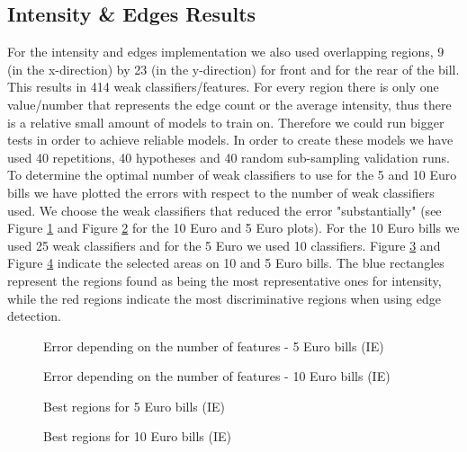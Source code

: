 \documentclass[11pt,twocolumn]{article}
\begin{document}
		
		\subsection{Intensity \& Edges Results}\label{sec:ie_results}
			For the intensity and edges implementation we also used overlapping regions, 9 (in the x-direction) by 23 (in the y-direction) for front and for the rear of the bill. This results in 414 weak classifiers/features. For every region there is only one value/number that represents the edge count or the average intensity, thus there is a relative small amount of models to train on. Therefore we could run bigger tests in order to achieve reliable models. In order to create these models we have used 40 repetitions, 40 hypotheses and 40 random sub-sampling validation runs. To determine the optimal number of weak classifiers to use for the 5 and 10 Euro bills we have plotted the errors with respect to the number of weak classifiers used. We choose the weak classifiers that reduced the error "substantially" (see Figure \ref{IE_plot5} and Figure \ref{IE_plot10} for the 10 Euro and 5 Euro plots). For the 10 Euro bills we used 25 weak classifiers and for the 5 Euro we used 10 classifiers. Figure \ref{ie_regions5} and Figure \ref{ie_regions10} indicate the selected areas on 10 and 5 Euro bills. The blue rectangles represent the regions found as being the most representative ones for intensity, while the red regions indicate the most discriminative regions when using edge detection.

		\begin{figure}[!hbtp]
			\centering
			\caption{Error depending on the number of features - 5 Euro bills (IE)}
			\label{IE_plot5}
		\end{figure} 

		\begin{figure}[!hbtp]
			\centering
			\caption{Error depending on the number of features - 10 Euro bills (IE)}
			\label{IE_plot10}
		\end{figure} 
		
		\begin{figure}[!hbtp]
			\centering
			\caption{Best regions for 5 Euro bills (IE)}
			\label{ie_regions5}
		\end{figure}
		
		\begin{figure}[!hbtp]
			\centering
			\caption{Best regions for 10 Euro bills (IE)}
			\label{ie_regions10}
		\end{figure}
		
\end{document}
